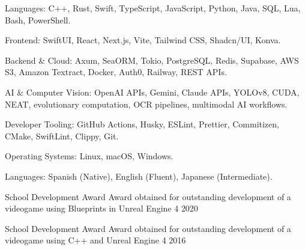 \documentclass{../../../Styles/MS-Style}
\begin{document}
\begin{Form}
	\begin{listBlock}

		\generalItem
		Languages: C++, Rust, Swift, TypeScript, JavaScript, Python, Java,
		SQL, Lua, Bash, PowerShell.

		\generalItem
		Frontend: SwiftUI, React, Next.js, Vite, Tailwind CSS, Shadcn/UI, Konva.

		\generalItem
		Backend \& Cloud: Axum, SeaORM, Tokio, PostgreSQL, Redis, Supabase,
		AWS S3, Amazon Textract, Docker, Auth0, Railway, REST APIs.

		\generalItem
		AI \& Computer Vision: OpenAI APIs, Gemini, Claude APIs, YOLOv8, CUDA,
		NEAT, evolutionary computation, OCR pipelines, multimodal AI workflows.

		\generalItem
		Developer Tooling: GitHub Actions, Husky, ESLint, Prettier,
		Commitizen, CMake, SwiftLint, Clippy, Git.

		\generalItem
		Operating Systems: Linux, macOS, Windows.

		\generalItem
		Languages: Spanish (Native), English (Fluent), Japanese (Intermediate).

	\end{listBlock}

	\sectionTitle{AWARDS AND HONORS}

	\begin{listBlock}

		\awardItem
		{School Development Award}
		{Award obtained for outstanding development of a videogame using Blueprints in Unreal Engine 4}
		{2020\cite{SoftwareEngineer2020Award}}

		\awardItem
		{School Development Award}
		{Award obtained for outstanding development of a videogame using C++ and Unreal Engine 4}
		{2016\cite{SoftwareEngineer2016Award}}

	\end{listBlock}

	\bibliographyBlock

\end{Form}
\end{document}
